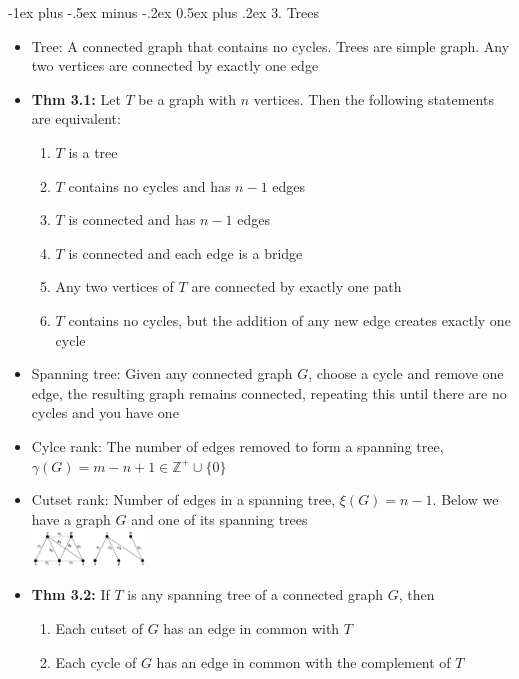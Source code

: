 \documentclass[10pt,landscape]{article}
\makeatletter
\renewcommand{\section}{\@startsection{section}{1}{0mm}%
                                {-1ex plus -.5ex minus -.2ex}%
                                {0.5ex plus .2ex}%
                                {\normalfont\large\bfseries}}
\makeatother
\begin{document}
\begin{multicols}{2}
\section{3. Trees}
\begin{itemize}
    \item Tree: A connected graph that contains no cycles. Trees are simple graph. Any two vertices are connected by exactly one edge
    \item \textbf{Thm 3.1:} Let $T$ be a graph with $n$ vertices. Then the following statements are equivalent:
    \begin{enumerate}
        \item $T$ is a tree
        \item $T$ contains no cycles and has $n-1$ edges
        \item $T$ is connected and has $n-1$ edges
        \item $T$ is connected and each edge is a bridge
        \item Any two vertices of $T$ are connected by exactly one path
        \item $T$ contains no cycles, but the addition of any new edge creates exactly one cycle
        \end{enumerate}
        \item Spanning tree: Given any connected graph $G$, choose a cycle and remove one edge, the resulting graph remains connected, repeating this until there are no cycles and you have one
        \item Cylce rank: The number of edges removed to form a spanning tree, $\gamma(G)=m-n+1 \in \mathbb{Z}^+\cup \{0\}$
        \item Cutset rank: Number of edges in a spanning tree, $\xi(G)=n-1$. Below we have a graph $G$ and one of its spanning trees\\
        \includegraphics[width = 3cm]{Spanning_Tree.png}
        \item \textbf{Thm 3.2:} If $T$ is any spanning tree of a connected graph $G$, then
        \begin{enumerate}
            \item Each cutset of $G$ has an edge in common with $T$
            \item Each cycle of $G$ has an edge in common with the complement of $T$
        \end{enumerate}

\end{itemize}
\end{multicols}
\end{document}

